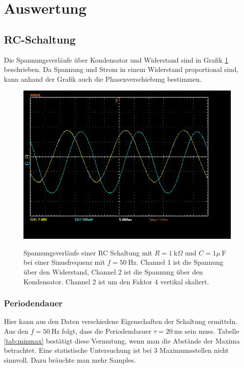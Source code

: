 \documentclass{article}
\begin{document}
\section{Auswertung}

\subsection{RC-Schaltung}

Die Spannungsverläufe über Kondensator und Widerstand sind in Grafik \ref{fig:schaltung1_sinus} beschrieben. Da Spannung und Strom in einem Widerstand proportional sind, kann anhand der Grafik auch die Phasenverschiebung bestimmen.


\begin{figure}[H]
\caption{Spannungsverläufe einer RC Schaltung mit $R=1~$k$\Omega$ und $C=1\mu~$F bei einer Sinusfrequenz mit $f=50~$Hz. Channel 1 ist die Spannung über den Widerstand, Channel 2 ist die Spannung über den Kondensator. Channel 2 ist um den Faktor 4 vertikal skaliert.}
\label{fig:schaltung1_sinus}
{\centering
\includegraphics[scale=0.4]{winkler/Schaltung_1_Sinus.png}}
\end{figure}




\subsubsection{Periodendauer}
Hier kann aus den Daten verschiedene Eigenschaften der Schaltung ermitteln. Aus den $f=50~$Hz folgt, dass die Periodendasuer $\tau = 20~$ms sein muss. Tabelle \ref{tab:minmax} bestätigt diese Vermutung, wenn man die Abstände der Maxima betrachtet. Eine statistische Untersuchung ist bei 3 Maximumsstellen nicht sinnvoll. Dazu bräuchte man mehr Samples.
\end{document}
